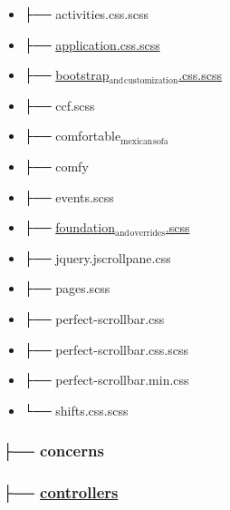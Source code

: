 \documentclass[11pt]{article}
\begin{document}
\begin{itemize}
\begin{itemize}
\item ├── activities.css.scss
\label{sec-1-1-1-3-1}
\item ├── \href{./app/assets/stylesheets/application.css.scss}{application.css.scss}
\label{sec-1-1-1-3-2}
\item ├── \href{./app/assets/stylesheets/bootstrap_and_customization.css.scss}{bootstrap$_{\text{and}}$$_{\text{customization}}$.css.scss}
\label{sec-1-1-1-3-3}
\item ├── ccf.scss
\label{sec-1-1-1-3-4}
\item ├── comfortable$_{\text{mexican}}$$_{\text{sofa}}$
\label{sec-1-1-1-3-5}
\item ├── comfy
\label{sec-1-1-1-3-6}
\item ├── events.scss
\label{sec-1-1-1-3-7}
\item ├── \href{./app/assets/stylesheets/foundation_and_overrides.scss}{foundation$_{\text{and}}$$_{\text{overrides}}$.scss}
\label{sec-1-1-1-3-8}
\item ├── jquery.jscrollpane.css
\label{sec-1-1-1-3-9}
\item ├── pages.scss
\label{sec-1-1-1-3-10}
\item ├── perfect-scrollbar.css
\label{sec-1-1-1-3-11}
\item ├── perfect-scrollbar.css.scss
\label{sec-1-1-1-3-12}
\item ├── perfect-scrollbar.min.css
\label{sec-1-1-1-3-13}
\item └── shifts.css.scss
\label{sec-1-1-1-3-14}
\end{itemize}
\end{itemize}

\subsubsection*{├── concerns}
\label{sec-1-1-2}
\subsubsection*{├── \href{./app/controllers}{controllers}}
\label{sec-1-1-3}
\end{document}
